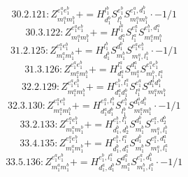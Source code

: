 \documentclass[letterpaper,10pt,fleqn,leqno,onecolumn]{article}
\begin{document}
\begin{equation} \;\;\;\;\;\;  30.2.121: Z^{e_{1}^{a}e_{1}^{b}}_{m_{1}^{a}m_{1}^{b}}+=H^{l_{1}^{b}}_{d_{1}^{b}}S^{e_{1}^{b}}_{l_{1}^{b}}S^{e_{1}^{a},d_{1}^{b}}_{m_{1}^{a}m_{1}^{b}}\cdot -1/1 \end{equation}
\begin{equation} \;\;\;\;\;\;  30.3.122: Z^{e_{1}^{a}e_{1}^{b}}_{m_{1}^{a}m_{1}^{b}}+=H^{l_{1}^{a}}_{d_{1}^{a}}S^{e_{1}^{a}}_{l_{1}^{a}}S^{e_{1}^{b},d_{1}^{a}}_{m_{1}^{a}m_{1}^{b}} \end{equation}
\begin{equation} \;\;\;\;\;\;  31.2.125: Z^{e_{1}^{a}e_{1}^{b}}_{m_{1}^{a}m_{1}^{b}}+=H^{l_{1}^{b}}_{d_{1}^{b}}S^{d_{1}^{b}}_{m_{1}^{b}}S^{e_{1}^{a}e_{1}^{b}}_{m_{1}^{a},l_{1}^{b}}\cdot -1/1 \end{equation}
\begin{equation} \;\;\;\;\;\;  31.3.126: Z^{e_{1}^{a}e_{1}^{b}}_{m_{1}^{a}m_{1}^{b}}+=H^{l_{1}^{a}}_{d_{1}^{a}}S^{d_{1}^{a}}_{m_{1}^{a}}S^{e_{1}^{a}e_{1}^{b}}_{m_{1}^{b},l_{1}^{a}} \end{equation}
\begin{equation} \;\;\;\;\;\;  32.2.129: Z^{e_{1}^{a}e_{1}^{b}}_{m_{1}^{a}m_{1}^{b}}+=H^{e_{1}^{b},l_{1}^{a}}_{d_{1}^{a}d_{1}^{b}}S^{e_{1}^{a}}_{l_{1}^{a}}S^{d_{1}^{a}d_{1}^{b}}_{m_{1}^{a}m_{1}^{b}} \end{equation}
\begin{equation} \;\;\;\;\;\;  32.3.130: Z^{e_{1}^{a}e_{1}^{b}}_{m_{1}^{a}m_{1}^{b}}+=H^{e_{1}^{a},l_{1}^{b}}_{d_{1}^{a}d_{1}^{b}}S^{e_{1}^{b}}_{l_{1}^{b}}S^{d_{1}^{a}d_{1}^{b}}_{m_{1}^{a}m_{1}^{b}}\cdot -1/1 \end{equation}
\begin{equation} \;\;\;\;\;\;  33.2.133: Z^{e_{1}^{a}e_{1}^{b}}_{m_{1}^{a}m_{1}^{b}}+=H^{e_{1}^{b},l_{1}^{b}}_{d_{1}^{b},d_{2}^{b}}S^{d_{1}^{b}}_{m_{1}^{b}}S^{e_{1}^{a},d_{2}^{b}}_{m_{1}^{a},l_{1}^{b}} \end{equation}
\begin{equation} \;\;\;\;\;\;  33.4.135: Z^{e_{1}^{a}e_{1}^{b}}_{m_{1}^{a}m_{1}^{b}}+=H^{e_{1}^{b},l_{1}^{a}}_{d_{1}^{b},d_{1}^{a}}S^{d_{1}^{b}}_{m_{1}^{b}}S^{e_{1}^{a},d_{1}^{a}}_{m_{1}^{a},l_{1}^{a}} \end{equation}
\begin{equation} \;\;\;\;\;\;  33.5.136: Z^{e_{1}^{a}e_{1}^{b}}_{m_{1}^{a}m_{1}^{b}}+=H^{e_{1}^{b},l_{1}^{a}}_{d_{1}^{a},d_{1}^{b}}S^{d_{1}^{a}}_{m_{1}^{a}}S^{e_{1}^{a},d_{1}^{b}}_{m_{1}^{b},l_{1}^{a}}\cdot -1/1 \end{equation}
\end{document}
